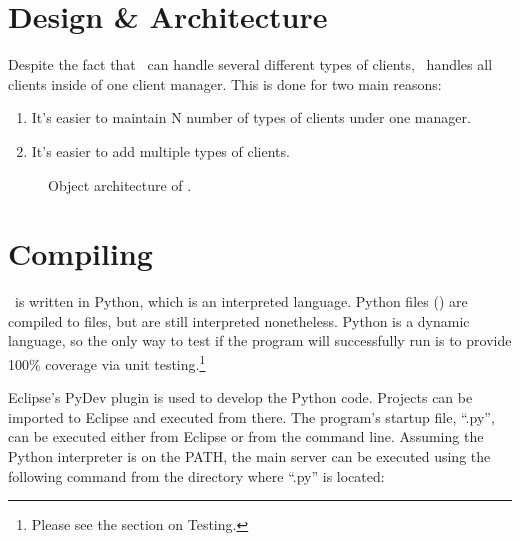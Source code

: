 \section{Design \& Architecture}

Despite the fact that \MainServer\ can handle several different types of clients, \MainServer\ handles all clients inside of one client manager. This is done for two main reasons:
\begin{enumerate}
	\item It's easier to maintain N number of types of clients under one manager.
	\item It's easier to add multiple types of clients.
\end{enumerate}

\newpage
\begin{figure}
	\centering
	\caption{Object architecture of \MainServer.}
	\label{fig:echelon_architecture}
\end{figure}

\section{Compiling}

\MainServer\ is written in Python, which is an interpreted language. Python files () are compiled to  files, but are still interpreted nonetheless. Python is a dynamic language, so the only way to test if the program will successfully run is to provide 100\% coverage via unit testing.\footnote{Please see the section on Testing.}

Eclipse's PyDev plugin is used to develop the Python code. Projects can be imported to Eclipse and executed from there. The program's startup file, ``\MainServer.py'', can be executed either from Eclipse or from the command line. Assuming the Python interpreter is on the PATH, the main server can be executed using the following command from the directory where ``\MainServer.py'' is located:

